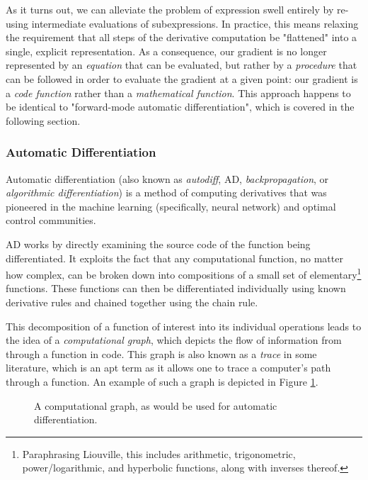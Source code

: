 As it turns out, we can alleviate the problem of expression swell entirely by re-using intermediate evaluations of subexpressions. In practice, this means relaxing the requirement that all steps of the derivative computation be "flattened" into a single, explicit representation. As a consequence, our gradient is no longer represented by an \textit{equation} that can be evaluated, but rather by a \textit{procedure} that can be followed in order to evaluate the gradient at a given point: our gradient is a \textit{code function} rather than a \textit{mathematical function}. This approach happens to be identical to "forward-mode automatic differentiation", which is covered in the following section.

\subsubsection{Automatic Differentiation}

Automatic differentiation (also known as \textit{autodiff}, AD, \textit{backpropagation}, or \textit{algorithmic differentiation}) is a method of computing derivatives that was pioneered in the machine learning (specifically, neural network) and optimal control communities.

AD works by directly examining the source code of the function being differentiated. It exploits the fact that any computational function, no matter how complex, can be broken down into compositions of a small set of elementary\footnote{Paraphrasing Liouville, this includes arithmetic, trigonometric, power/logarithmic, and hyperbolic functions, along with inverses thereof.} functions. These functions can then be differentiated individually using known derivative rules and chained together using the chain rule.

This decomposition of a function of interest into its individual operations leads to the idea of a \textit{computational graph}, which depicts the flow of information from through a function in code. This graph is also known as a \textit{trace} in some literature, which is an apt term as it allows one to trace a computer's path through a function. An example of such a graph is depicted in Figure \ref{fig:computational-graph}.

\begin{figure}[H]
    \centering
    \centerline{}
    \caption{A computational graph, as would be used for automatic differentiation.}
    \label{fig:computational-graph}
\end{figure}

